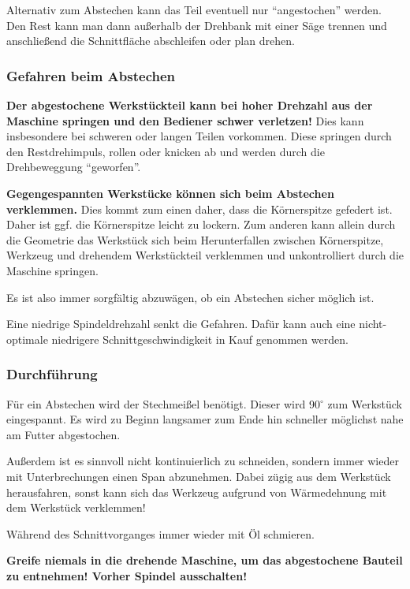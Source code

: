 \documentclass{\basedir/fablab-document}
\begin{document}
Alternativ zum Abstechen kann das Teil eventuell nur \enquote{angestochen} werden. Den Rest kann man dann außerhalb der Drehbank mit einer Säge trennen und anschließend die Schnittfläche abschleifen oder plan drehen.

\subsubsection{Gefahren beim Abstechen}
\textbf{Der abgestochene Werkstückteil kann bei hoher Drehzahl aus der Maschine springen und den Bediener schwer verletzen!} Dies kann insbesondere bei schweren oder langen Teilen vorkommen. Diese springen durch den Restdrehimpuls, rollen oder knicken ab und werden durch die Drehbeweggung \enquote{geworfen}.

\textbf{Gegengespannten Werkstücke können sich beim Abstechen verklemmen.} Dies kommt zum einen daher, dass die Körnerspitze gefedert ist. Daher ist ggf. die Körnerspitze leicht zu lockern. Zum anderen kann allein durch die Geometrie das Werkstück sich beim Herunterfallen zwischen Körnerspitze, Werkzeug und drehendem Werkstückteil verklemmen und unkontrolliert durch die Maschine springen.

Es ist also immer sorgfältig abzuwägen, ob ein Abstechen sicher möglich ist.

Eine niedrige Spindeldrehzahl senkt die Gefahren. Dafür kann auch eine nicht-optimale niedrigere Schnittgeschwindigkeit in Kauf genommen werden.


\subsubsection{Durchführung}
Für ein Abstechen wird der Stechmeißel benötigt. Dieser wird 90$^\circ$ zum Werkstück eingespannt.
Es wird zu Beginn langsamer zum Ende hin schneller möglichst nahe am Futter abgestochen.


Außerdem ist es sinnvoll nicht kontinuierlich zu schneiden, sondern immer wieder mit Unterbrechungen einen Span abzunehmen.
Dabei zügig aus dem Werkstück herausfahren, sonst kann sich das Werkzeug aufgrund von Wärmedehnung mit dem Werkstück verklemmen!

Während des Schnittvorganges immer wieder mit Öl schmieren.

\textbf{Greife niemals in die drehende Maschine, um das abgestochene Bauteil zu entnehmen! Vorher Spindel ausschalten!}
\end{document}
